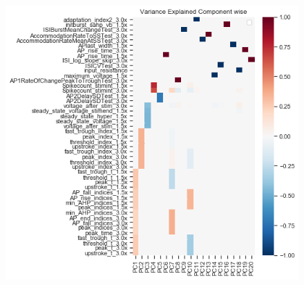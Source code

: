 \begin{figure}    
    \begin{center}
    \includegraphics[scale=0.75]{figures/cortical_model_data_agreement_54_1.png}
    
    
    \end{center}
\end{figure}    
\cite{wang2019sag}

